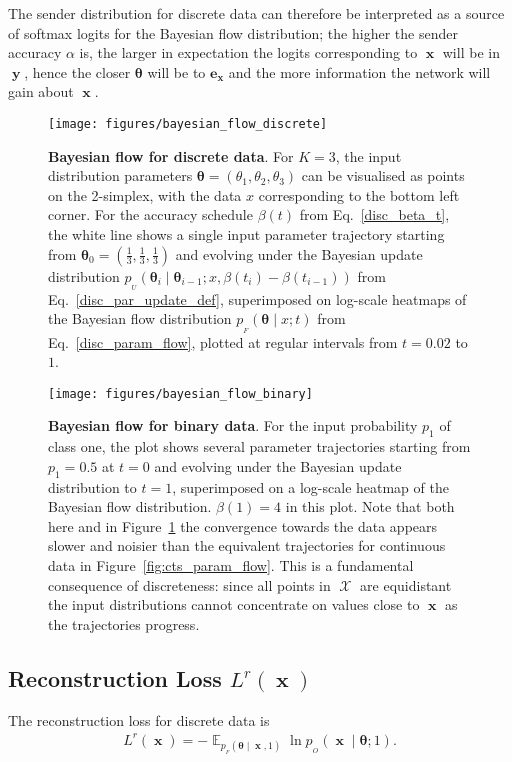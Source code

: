 \documentclass[11pt,table]{article}
\DeclareMathOperator*{\E}{\mathbb{E}}
\DeclareMathOperator{\x}{\mathbf{x}}
\DeclareMathOperator{\X}{\mathcal{X}}
\DeclareMathOperator{\y}{\mathbf{y}}
\newcommand{\tidx}[2]{#1_{#2}}
\renewcommand{\vec}[1]{\boldsymbol{#1}}
\newcommand{\pars}{\theta}
\newcommand{\parsn}{\vec{\pars}}
\newcommand{\parsnt}[1]{\tidx{\parsn}{#1}}
\newcommand{\0}[1]{\constvec{0}{#1}}
\newcommand{\1}[1]{\constvec{1}{#1}}
\newcommand{\oh}[2]{\mathbf{e}_{#1}}
\newcommand{\out}{p_{_O}}
\newcommand{\flow}{p_{_F}}
\newcommand{\update}{p_{_U}}
\begin{document}
The sender distribution for discrete data can therefore be interpreted as a source of softmax logits for the Bayesian flow distribution; the higher the sender accuracy $\alpha$ is, the larger in expectation the logits corresponding to $\x$ will be in $\y$, hence the closer $\parsn$ will be to $\oh{\x}{KD}$ and the more information the network will gain about $\x$.
\begin{figure}[t!]
\texttt{[image: figures/bayesian\_flow\_discrete]}
\caption{\textbf{Bayesian flow for discrete data}. For $K=3$, the input distribution parameters $\parsn = (\theta_1, \theta_2, \theta_3)$ can be visualised as points on the 2-simplex, with the data $x$ corresponding to the bottom left corner. For the accuracy schedule $\beta(t)$ from Eq.~\ref{disc_beta_t}, the white line shows a single input parameter trajectory starting from $\parsnt{0} = \left(\frac{1}{3},\frac{1}{3},\frac{1}{3}\right)$ and evolving under the Bayesian update distribution $\update(\parsnt{i} \mid \parsnt{i-1}; x, \beta(t_i)-\beta(t_{i-1}))$ from Eq.~\ref{disc_par_update_def}, superimposed on log-scale heatmaps of the Bayesian flow distribution $\flow(\parsn \mid x; t)$ from Eq.~\ref{disc_param_flow}, plotted at regular intervals from $t=0.02$ to $1$.}
\label{fig:bayes_flow_disc}
\end{figure}
\begin{figure}[t!]
\texttt{[image: figures/bayesian\_flow\_binary]}
\caption{\textbf{Bayesian flow for binary data}.
For the input probability $p_1$ of class one, the plot shows several parameter trajectories starting from $p_1 = 0.5$ at $t=0$ and evolving under the Bayesian update distribution to $t=1$, superimposed on a log-scale heatmap of the Bayesian flow distribution.
$\beta(1) = 4$ in this plot.
Note that both here and in Figure~\ref{fig:bayes_flow_disc} the convergence towards the data appears slower and noisier than the equivalent trajectories for continuous data in Figure~\ref{fig:cts_param_flow}. 
This is a fundamental consequence of discreteness: since all points in $\X$ are equidistant the input distributions cannot concentrate on values close to $\x$ as the trajectories progress.}
\label{fig:bayes_flow_bin}
\end{figure}
\subsection{Reconstruction Loss \texorpdfstring{$L^r(\x)$}{}}\label{sec:disc_reconstruction}
The reconstruction loss for discrete data is
\begin{align}
L^r(\x) = -\E_{\flow(\parsn \mid \x, 1)}\ln \out(\x \mid \parsn; 1).\label{disc_reconstruction_loss}
\end{align}
\end{document}
